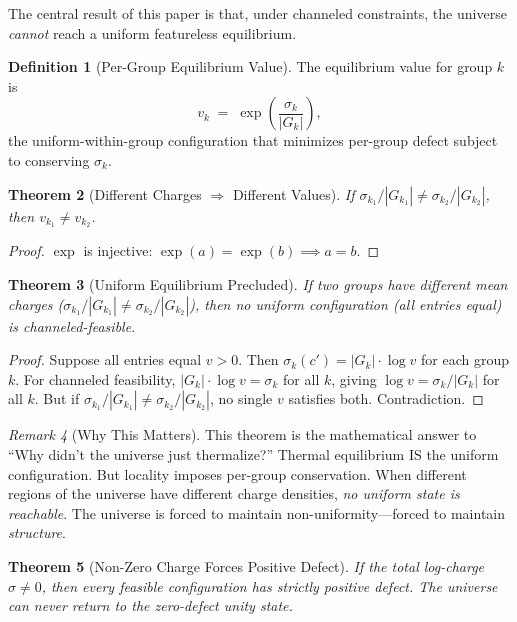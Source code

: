 \documentclass[11pt,a4paper]{article}
\theoremstyle{plain}
\newtheorem{theorem}{Theorem}[section]
\theoremstyle{definition}
\newtheorem{definition}[theorem]{Definition}
\theoremstyle{remark}
\newtheorem{remark}[theorem]{Remark}
\begin{document}
The central result of this paper is that, under channeled constraints, the universe \emph{cannot} reach a uniform featureless equilibrium.

\begin{definition}[Per-Group Equilibrium Value]\label{def:groupeq}
The equilibrium value for group $k$ is
\[
v_k \;=\; \exp\!\left(\frac{\sigma_k}{|G_k|}\right),
\]
the uniform-within-group configuration that minimizes per-group defect subject to conserving $\sigma_k$.
\end{definition}

\begin{theorem}[Different Charges $\Rightarrow$ Different Values]\label{thm:different}
If $\sigma_{k_1}/|G_{k_1}| \ne \sigma_{k_2}/|G_{k_2}|$, then $v_{k_1} \ne v_{k_2}$.
\end{theorem}

\begin{proof}
$\exp$ is injective: $\exp(a) = \exp(b) \implies a = b$.
\end{proof}

\begin{theorem}[Uniform Equilibrium Precluded]\label{thm:precluded}
If two groups have different mean charges ($\sigma_{k_1}/|G_{k_1}| \ne \sigma_{k_2}/|G_{k_2}|$), then no uniform configuration (all entries equal) is channeled-feasible.
\end{theorem}

\begin{proof}
Suppose all entries equal $v > 0$.
Then $\sigma_k(c') = |G_k| \cdot \log v$ for each group $k$.
For channeled feasibility, $|G_k| \cdot \log v = \sigma_k$ for all $k$, giving $\log v = \sigma_k / |G_k|$ for all $k$.
But if $\sigma_{k_1}/|G_{k_1}| \ne \sigma_{k_2}/|G_{k_2}|$, no single $v$ satisfies both.
Contradiction.
\end{proof}

\begin{remark}[Why This Matters]
This theorem is the mathematical answer to ``Why didn't the universe just thermalize?''
Thermal equilibrium IS the uniform configuration.
But locality imposes per-group conservation.
When different regions of the universe have different charge densities, \emph{no uniform state is reachable}.
The universe is forced to maintain non-uniformity---forced to maintain \emph{structure}.
\end{remark}

\begin{theorem}[Non-Zero Charge Forces Positive Defect]\label{thm:positivedefect}
If the total log-charge $\sigma \ne 0$, then every feasible configuration has strictly positive defect.
The universe can never return to the zero-defect unity state.
\end{theorem}
\end{document}
